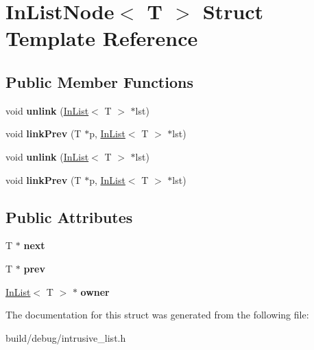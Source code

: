 \hypertarget{structInListNode}{\section{In\-List\-Node$<$ T $>$ Struct Template Reference}
\label{structInListNode}
}
\subsection*{Public Member Functions}
\begin{DoxyCompactItemize}
\item 
\hypertarget{structInListNode_a12c5300cc44a7d5358566fa7349c68bf}{void {\bfseries unlink} (\hyperlink{classInList}{In\-List}$<$ T $>$ $\ast$lst)}\label{structInListNode_a12c5300cc44a7d5358566fa7349c68bf}

\item 
\hypertarget{structInListNode_a76c4eacdbb651822ff9c9caba0600082}{void {\bfseries link\-Prev} (T $\ast$p, \hyperlink{classInList}{In\-List}$<$ T $>$ $\ast$lst)}\label{structInListNode_a76c4eacdbb651822ff9c9caba0600082}

\item 
\hypertarget{structInListNode_a12c5300cc44a7d5358566fa7349c68bf}{void {\bfseries unlink} (\hyperlink{classInList}{In\-List}$<$ T $>$ $\ast$lst)}\label{structInListNode_a12c5300cc44a7d5358566fa7349c68bf}

\item 
\hypertarget{structInListNode_a76c4eacdbb651822ff9c9caba0600082}{void {\bfseries link\-Prev} (T $\ast$p, \hyperlink{classInList}{In\-List}$<$ T $>$ $\ast$lst)}\label{structInListNode_a76c4eacdbb651822ff9c9caba0600082}

\end{DoxyCompactItemize}
\subsection*{Public Attributes}
\begin{DoxyCompactItemize}
\item 
\hypertarget{structInListNode_a3cb01353f2f7e190c551e59d805fc0a0}{T $\ast$ {\bfseries next}}\label{structInListNode_a3cb01353f2f7e190c551e59d805fc0a0}

\item 
\hypertarget{structInListNode_abe7737b9df6f3714312ee23bda3dad20}{T $\ast$ {\bfseries prev}}\label{structInListNode_abe7737b9df6f3714312ee23bda3dad20}

\item 
\hypertarget{structInListNode_abbef6ba0be94d2d501b77f64fdfe519a}{\hyperlink{classInList}{In\-List}$<$ T $>$ $\ast$ {\bfseries owner}}\label{structInListNode_abbef6ba0be94d2d501b77f64fdfe519a}

\end{DoxyCompactItemize}


The documentation for this struct was generated from the following file\-:\begin{DoxyCompactItemize}
\item 
build/debug/intrusive\-\_\-list.\-h\end{DoxyCompactItemize}
